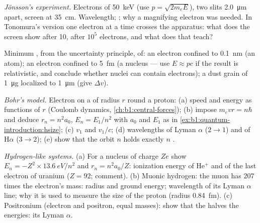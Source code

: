 \begin{exercise}[$\star\star$]\label{exo:b1:quantum-introduction:7}
\emph{Jönsson's experiment.} Electrons of \qty{50}{keV} (use $p =
\sqrt{2m_eE}$), two slits \qty{2.0}{\micro m} apart, screen at
\qty{35}{cm}. Wavelength; ; why a magnifying electron 
was needed. In Tonomura's version one electron at a time crosses the
apparatus: what does the screen show after 10, after $10^5$ electrons,
and what does that teach?
\end{exercise}

\begin{exercise}[$\star\star$]\label{exo:b1:quantum-introduction:8}
Minimum , from the uncertainty principle, of: an
electron confined to \qty{0.1}{nm} (an atom); an electron confined to
\qty{5}{fm} (a nucleus --- use $E \approx pc$ if the result is
relativistic, and conclude whether nuclei can contain electrons); a
dust grain of \qty{1}{\micro g} localized to \qty{1}{\micro m} (give $\Delta v$).
\end{exercise}

\begin{exercise}[$\star\star$]\label{exo:b1:quantum-introduction:9}
\emph{Bohr's model.} Electron on a  of radius $r$ round a
proton: (a) speed and energy as functions of $r$ (Coulomb dynamics,
\cref{ch:b1:central-forces}); (b) impose $m_evr = n\hbar$ and deduce
$r_n = n^2a_0$, $E_n = E_1/n^2$ with $a_0$ and $E_1$ as in
\cref{ex:b1:quantum-introduction:hsize}; (c) $v_1$ and $v_1/c$; (d)
wavelengths of Lyman $\alpha$ ($2 \to 1$) and of H$\alpha$ ($3 \to 2$);
(e) show that the orbit $n$ holds exactly $n$ .
\end{exercise}

\begin{exercise}[$\star\star\star$]\label{exo:b1:quantum-introduction:10}
\emph{Hydrogen-like systems.} (a) For a nucleus of charge $Ze$ show
$E_n = -Z^2 \times \qty{13.6}{eV}/n^2$ and $r_n = n^2a_0/Z$: ionization
energy of He$^+$ and of the last electron of uranium ($Z = 92$; comment).
(b) Muonic hydrogen: the muon has $207$ times the electron's mass:
radius and ground energy; wavelength of its Lyman $\alpha$ line; why it
is used to measure the size of the proton (radius \qty{0.84}{fm}).
(c) Positronium (electron and positron, equal masses): show that the
 halves the energies: its Lyman $\alpha$.
\end{exercise}

